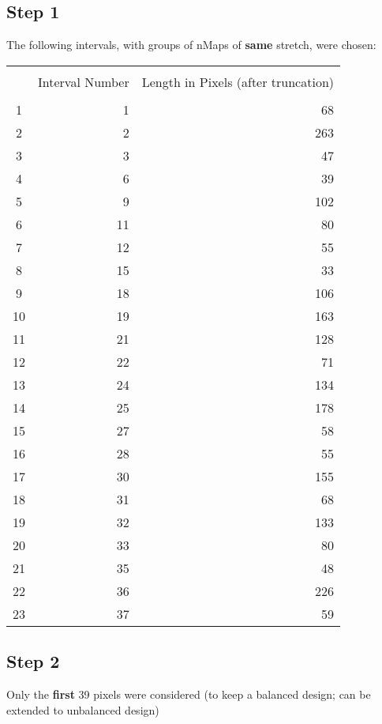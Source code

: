 \documentclass[14pt]{article}
\begin{document}
\subsection*{Step 1}
The following intervals, with groups of nMaps of {\bf{same}} stretch, were chosen:
\begin{table}[h]
\centering
\begin{tabular}{crr}
\hline \\
& Interval Number & Length in Pixels (after truncation) \\
\hline \hline \\
1 & 1 & 68 \\
2 & 2 & 263 \\
3 & 3 & 47 \\ 
4 & 6 & 39 \\ 
5 & 9 & 102 \\
6 & 11 & 80 \\ 
7 & 12 & 55 \\
8 & 15 & 33 \\ 
9 & 18 & 106 \\
10 & 19 & 163 \\
11 & 21 & 128 \\
12 & 22 & 71 \\
13 & 24 & 134 \\
14 & 25 & 178 \\
15 & 27 & 58 \\
16 & 28 & 55 \\
17 & 30 & 155 \\
18 & 31 & 68 \\
19 & 32 & 133 \\
20 & 33 & 80 \\
21 & 35 & 48 \\
22 & 36 & 226 \\
23 & 37 & 59 \\
\hline \hline
\end{tabular}
\end{table}

\subsection*{Step 2}
Only the {\bf{first}} 39 pixels were considered (to keep a balanced design; can be extended to unbalanced design)
\end{document}
